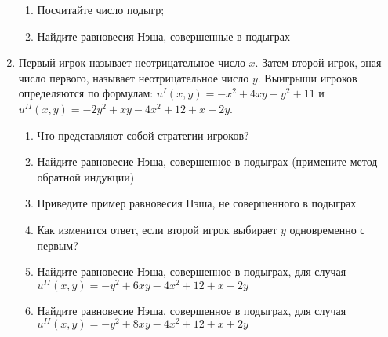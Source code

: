 \documentclass[pdftex,12pt,a4paper]{article}
\begin{document}
\begin{enumerate}


\begin{enumerate}
\item Посчитайте число подыгр;
\item Найдите равновесия Нэша, совершенные в подыграх 
\end{enumerate}

\item Первый игрок называет неотрицательное число $x$. Затем второй игрок, зная число первого, называет неотрицательное число $y$. Выигрыши игроков определяются по формулам: $u^I \left( {x,y} \right) =  - x^2  + 4xy - y^2  + 11$ и $u^{II} \left( {x,y} \right) =  - 2y^2  + xy - 4x^2  + 12 + x + 2y$.
\begin{enumerate}
\item Что представляют собой стратегии игроков?
\item Найдите равновесие Нэша, совершенное в подыграх (примените метод обратной индукции)
\item Приведите пример равновесия Нэша, не совершенного в подыграх
\item Как изменится ответ, если второй игрок выбирает $y$ одновременно с первым?
\item Найдите равновесие Нэша, совершенное в подыграх, для случая $u^{II} \left( {x,y} \right) =  - y^2  + 6xy - 4x^2  + 12 + x - 2y$
\item Найдите равновесие Нэша, совершенное в подыграх, для случая $u^{II} \left( {x,y} \right) =  - y^2  + 8xy - 4x^2  + 12 + x + 2y$
\end{enumerate}


\end{enumerate}
\end{document}
